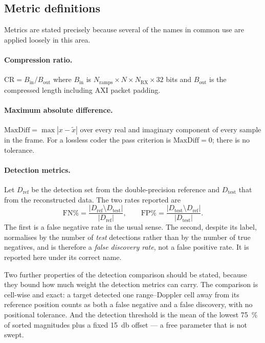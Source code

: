 \documentclass[10pt,twocolumn]{article}
\begin{document}
\subsection{Metric definitions}
\label{sec:metrics}

Metrics are stated precisely because several of the names in common use are
applied loosely in this area.

\paragraph{Compression ratio.}
$\mathrm{CR} = B_{\mathrm{in}} / B_{\mathrm{out}}$ where $B_{\mathrm{in}}$ is
$N_{\mathrm{ramps}} \times N \times N_{\mathrm{RX}} \times 32$ bits and
$B_{\mathrm{out}}$ is the compressed length including AXI packet padding.

\paragraph{Maximum absolute difference.}
$\mathrm{MaxDiff} = \max |x - \tilde{x}|$ over every real and imaginary
component of every sample in the frame. For a lossless coder the pass criterion
is $\mathrm{MaxDiff} = 0$; there is no tolerance.

\paragraph{Detection metrics.}
Let $D_{\mathrm{ref}}$ be the detection set from the double-precision reference
and $D_{\mathrm{test}}$ that from the reconstructed data. The two rates
reported are
\begin{equation}
\mathrm{FN}\% = \frac{|D_{\mathrm{ref}} \setminus D_{\mathrm{test}}|}{|D_{\mathrm{ref}}|},
\qquad
\mathrm{FP}\% = \frac{|D_{\mathrm{test}} \setminus D_{\mathrm{ref}}|}{|D_{\mathrm{test}}|}.
\end{equation}
The first is a false negative rate in the usual sense. The second, despite its
label, normalises by the number of \emph{test} detections rather than by the
number of true negatives, and is therefore a \emph{false discovery rate}, not a
false positive rate. It is reported here under its correct name.

Two further properties of the detection comparison should be stated, because
they bound how much weight the detection metrics can carry. The comparison is
cell-wise and exact: a target detected one range--Doppler cell away from its
reference position counts as both a false negative and a false discovery, with
no positional tolerance. And the detection threshold is the mean of the lowest
\SI{75}{\percent} of sorted magnitudes plus a fixed \SI{15}{\decibel} offset ---
a free parameter that is not swept.
\end{document}
